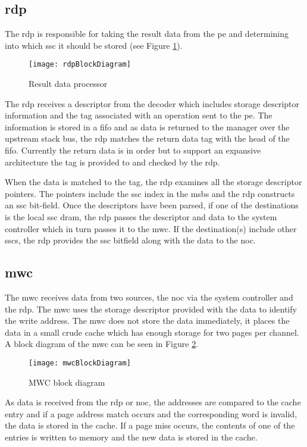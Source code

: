 \subsection{\Acf{rdp}}
\label{sec:RDP}
The \ac{rdp} is responsible for taking the result data from the \ac{pe} and determining into which \ac{ssc} it should be stored (see Figure \ref{fig:RDP block diagram}).

\begin{figure}[h]
\centering
\captionsetup{justification=centering}
\captionsetup{width=.9\linewidth}
\centerline{
\mbox{\texttt{[image: rdpBlockDiagram]}}
}
\center\caption{Result data processor}
\label{fig:RDP block diagram}
\end{figure}

The \ac{rdp} receives a descriptor from the decoder which includes storage descriptor information and the tag associated with an operation sent to the \ac{pe}.
The information is stored in a \ac{fifo} and as data is returned to the manager over the upstream stack bus, the \ac{rdp} matches the return data tag with the head of the \ac{fifo}.
Currently the return data is in order but to support an expansive architecture the tag is provided to and checked by the \ac{rdp}.

When the data is matched to the tag, the \ac{rdp} examines all the storage descriptor pointers. The pointers include the \ac{ssc} index in the \acp{msb} and the \ac{rdp} constructs an \ac{ssc} bit-field.
Once the descriptors have been parsed, if one of the destinations is the local \ac{ssc} \ac{dram}, the \ac{rdp} passes the descriptor and data to the system controller which in turn passes it to the \ac{mwc}.
If the destination(s) include other \acp{ssc}, the \ac{rdp} provides the \ac{ssc} bitfield along with the data to the \ac{noc}.


\subsection{\Acf{mwc}}
\label{sec:MWC}

The \acf{mwc} receives data from two sources, the \ac{noc} via the system controller and the \ac{rdp}.
The \ac{mwc} uses the storage descriptor provided with the data to identify the write address.
The \ac{mwc} does not store the data immediately, it places the data in a small crude cache which has enough storage for two pages per channel.
A block diagram of the \ac{mwc} can be seen in Figure \ref{fig:MWC block diagram}.
\begin{figure}[h]
\centering
\captionsetup{justification=centering}
\captionsetup{width=.9\linewidth}
\centerline{
\mbox{\texttt{[image: mwcBlockDiagram]}}
}
\center\caption{MWC block diagram}
\label{fig:MWC block diagram}
\end{figure}
As data is received from the \ac{rdp} or \ac{noc}, the addresses are compared to the cache entry and if a page address match occurs and the corresponding word is invalid, the data is stored in the cache.
If a page miss occurs, the contents of one of the entries is written to memory and the new data is stored in the cache.

